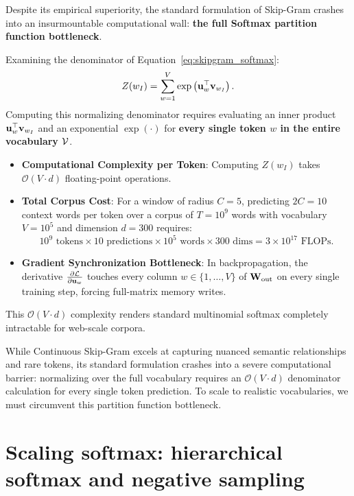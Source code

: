 \documentclass[../../main.tex]{subfiles}
\begin{document}
Despite its empirical superiority, the standard formulation of Skip-Gram crashes into an insurmountable computational wall: \textbf{the full Softmax partition function bottleneck}.

Examining the denominator of Equation~\eqref{eq:skipgram_softmax}:
\begin{equation}
\label{eq:partition_function}
Z(w_I) = \sum_{w=1}^V \exp\left( \mathbf{u}_w^\top \mathbf{v}_{w_I} \right).
\end{equation}
Computing this normalizing denominator requires evaluating an inner product $\mathbf{u}_w^\top \mathbf{v}_{w_I}$ and an exponential $\exp(\cdot)$ for \textbf{every single token $w$ in the entire vocabulary $\mathcal{V}$}.
\begin{itemize}
    \item \textbf{Computational Complexity per Token}: Computing $Z(w_I)$ takes $\mathcal{O}(V \cdot d)$ floating-point operations.
    \item \textbf{Total Corpus Cost}: For a window of radius $C = 5$, predicting $2C = 10$ context words per token over a corpus of $T = 10^9$ words with vocabulary $V = 10^5$ and dimension $d = 300$ requires:
    \begin{equation}
    \label{eq:flops_wall}
    10^9 \text{ tokens} \times 10 \text{ predictions} \times 10^5 \text{ words} \times 300 \text{ dims} = 3 \times 10^{17} \text{ FLOPs}.
    \end{equation}
    \item \textbf{Gradient Synchronization Bottleneck}: In backpropagation, the derivative $\frac{\partial \mathcal{L}}{\partial \mathbf{u}_w}$ touches every column $w \in \{1, \dots, V\}$ of $\mathbf{W}_{\text{out}}$ on every single training step, forcing full-matrix memory writes.
\end{itemize}
This $\mathcal{O}(V \cdot d)$ complexity renders standard multinomial softmax completely intractable for web-scale corpora.

While Continuous Skip-Gram excels at capturing nuanced semantic relationships and rare tokens, its standard formulation crashes into a severe computational barrier: normalizing over the full vocabulary requires an $\mathcal{O}(V \cdot d)$ denominator calculation for every single token prediction. To scale to realistic vocabularies, we must circumvent this partition function bottleneck.

\section{Scaling softmax: hierarchical softmax and negative sampling}
\label{sec:scaling_softmax}
\end{document}
